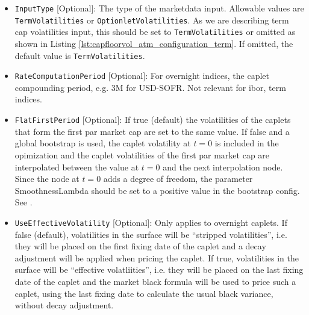 \begin{itemize}
\item \lstinline!InputType! [Optional]:
The type of the marketdata input. Allowable values are \lstinline!TermVolatilities! or \lstinline!OptionletVolatilities!. As we are describing term cap volatilities input, this should be set to \lstinline!TermVolatilities! or omitted as shown in Listing \ref{lst:capfloorvol_atm_configuration_term}. If omitted, the default value is \lstinline!TermVolatilities!.

\item \lstinline!RateComputationPeriod! [Optional]:
For overnight indices, the caplet compounding period, e.g. 3M for USD-SOFR. Not relevant for ibor, term indices.

\item \lstinline!FlatFirstPeriod! [Optional]:
If true (default) the volatilities of the caplets that form the first par market cap are set to the same value. If false
and a global bootstrap is used, the caplet volatility at $t=0$ is included in the opimization and the caplet
volatilities of the first par market cap are interpolated between the value at $t=0$ and the next interpolation
node. Since the node at $t=0$ adds a degree of freedom, the parameter SmoothnessLambda should be set to a positive value
in the bootstrap config. See \label{sec:bootstrap_config}.

\item \lstinline!UseEffectiveVolatility! [Optional]:
Only applies to overnight caplets. If false (default), volatilities in the surface will be ``stripped volatilities'',
i.e. they will be placed on the first fixing date of the caplet and a decay adjustment will be applied when pricing the
caplet. If true, volatilities in the surface will be ``effective volatliities'', i.e. they will be placed on the last
fixing date of the caplet and the market black formula will be used to price such a caplet, using the last fixing date
to calculate the usual black variance, without decay adjustment.

\end{itemize}

